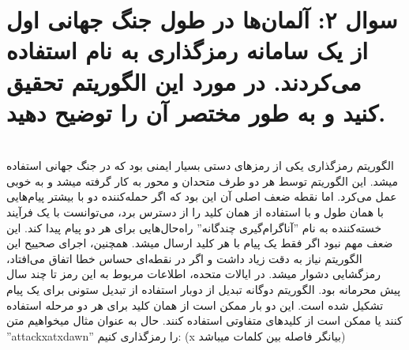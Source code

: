 \documentclass{article}
\begin{document}
\section*{سوال ۲: آلمان‌ها در طول جنگ جهانی اول از یک سامانه رمزگذاری به نام  استفاده می‌کردند. در مورد این الگوریتم تحقیق کنید و به طور مختصر آن را توضیح دهید.}
\leavevmode \\
الگوریتم رمزگذاری  یکی از رمزهای دستی بسیار ایمنی بود که در جنگ جهانی استفاده میشد. این الگوریتم توسط هر دو طرف متحدان و محور به کار گرفته میشد و به خوبی عمل می‌کرد. اما نقطه ضعف اصلی آن این بود که اگر حمله‌کننده دو با بیشتر پیام‌هایی با همان طول و با استفاده از همان کلید را از دسترس برد، می‌توانست با یک فرآیند خسته‌کننده به نام ''آناگرام‌گیری چندگانه'' راه‌حال‌هایی برای هر دو پیام پیدا کند. این ضعف مهم نبود اگر فقط یک پیام با هر کلید ارسال میشد. همچنین، اجرای صحییح این الگوریتم نیاز به دقت زیاد داشت و اگر در نقطه‌ای حساس خطا اتفاق می‌افتاد، رمزگشایی دشوار میشد. در ایالات متحده، اطلاعات مربوط به  این رمز تا چند سال پیش محرمانه بود. الگوریتم دوگانه تبدیل از دوبار استفاده از تبدیل ستونی برای یک پیام تشکیل شده است. این دو بار ممکن است از همان کلید برای هر دو مرحله استفاده کنند یا ممکن است از کلیدهای متفاوتی استفاده کنند. حال به عنوان مثال میخواهیم متن ''attackxatxdawn'' را رمزگذاری کنیم: (x بیانگر فاصله بین کلمات میباشد)
\end{document}
